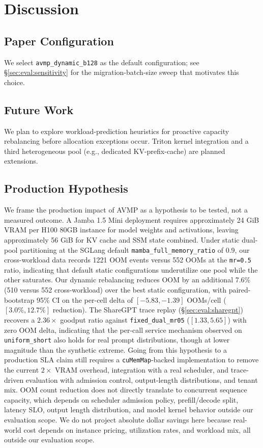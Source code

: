 \section{Discussion}
\label{sec:discussion}

\subsection{Paper Configuration}
\label{sec:discussion:config}

We select \texttt{avmp\_dynamic\_b128} as the default configuration; see \S\ref{sec:eval:sensitivity} for the migration-batch-size sweep that motivates this choice.

\subsection{Future Work}
\label{sec:discussion:future}

We plan to explore workload-prediction heuristics for proactive capacity rebalancing before allocation exceptions occur. Triton kernel integration and a third heterogeneous pool (e.g., dedicated KV-prefix-cache) are planned extensions.

\subsection{Production Hypothesis}
\label{sec:discussion:hypothesis}

We frame the production impact of AVMP as a hypothesis to be tested, not a measured outcome. A Jamba 1.5 Mini deployment requires approximately 24 GiB VRAM per H100 80GB instance for model weights and activations, leaving approximately 56 GiB for KV cache and SSM state combined. Under static dual-pool partitioning at the SGLang default \texttt{mamba\_full\_memory\_ratio} of 0.9, our cross-workload data records 1221 OOM events versus 552 OOMs at the \texttt{mr=0.5} ratio, indicating that default static configurations underutilize one pool while the other saturates. Our dynamic rebalancing reduces OOM by an additional 7.6\% (510 versus 552 cross-workload) over the best static configuration, with paired-bootstrap 95\% CI on the per-cell delta of $[-5.83, -1.39]$ OOMs/cell ($[3.0\%, 12.7\%]$ reduction). The ShareGPT trace replay (\S\ref{sec:eval:sharegpt}) recovers a $2.36\times$ goodput ratio against \texttt{fixed\_dual\_mr05} ($[1.33, 5.65]$) with zero OOM delta, indicating that the per-call service mechanism observed on \texttt{uniform\_short} also holds for real prompt distributions, though at lower magnitude than the synthetic extreme. Going from this hypothesis to a production SLA claim still requires a \texttt{cuMemMap}-backed implementation to remove the current $2\times$ VRAM overhead, integration with a real scheduler, and trace-driven evaluation with admission control, output-length distributions, and tenant mix. OOM count reduction does not directly translate to concurrent sequence capacity, which depends on scheduler admission policy, prefill/decode split, latency SLO, output length distribution, and model kernel behavior outside our evaluation scope. We do not project absolute dollar savings here because real-world cost depends on instance pricing, utilization rates, and workload mix, all outside our evaluation scope.
